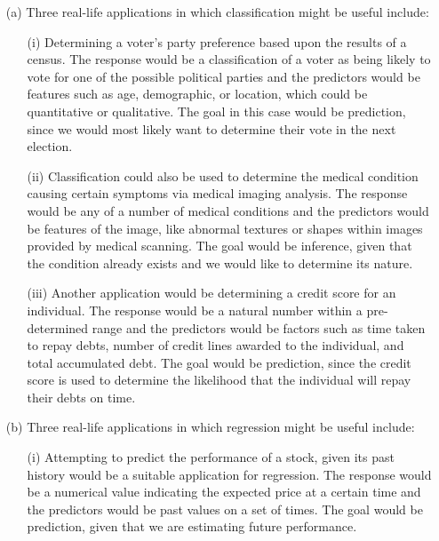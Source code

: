 
\begin{itemize}
    \item[(a)] Three real-life applications in which classification might be useful
    include: 
    \begin{itemize}
        \item[(i)] Determining a voter's party preference based upon the results of 
        a census. The response would be a classification of a voter as being likely 
        to vote for one of the possible political parties and the predictors would be 
        features such as age, demographic, or location, which could be quantitative
        or qualitative. The goal in this case would be prediction, since we would 
        most likely want to determine their vote in the next election.
        \item[(ii)] Classification could also be used to determine the medical 
        condition causing certain symptoms via medical imaging analysis. The 
        response would be any of a number of medical conditions and the predictors  
        would be features of the image, like abnormal textures or shapes within 
        images provided by medical scanning. The goal would be inference, given that 
        the condition already exists and we would like to determine its nature.
        \item[(iii)] Another application would be determining a credit score for
        an individual. The response would be a natural number within a pre-determined 
        range and the predictors would be factors such as time taken to repay debts,
        number of credit lines awarded to the individual, and total accumulated debt.
        The goal would be prediction, since the credit score is used to determine 
        the likelihood that the individual will repay their debts on time.
    \end{itemize}
    \item[(b)] Three real-life applications in which regression might be useful
    include:
    \begin{itemize}
        \item[(i)] Attempting to predict the performance of a stock, given its
        past history would be a suitable application for regression. The response
        would be a numerical value indicating the expected price at a certain time
        and the predictors would be past values on a set of times. The goal would
        be prediction, given that we are estimating future performance.

\end{itemize}
\end{itemize}
